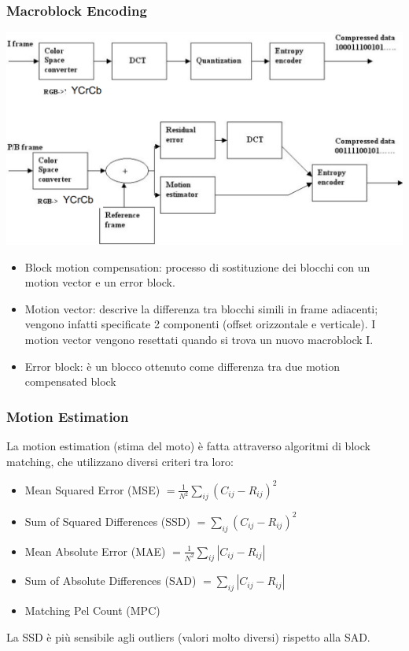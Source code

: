 \documentclass[a4paper,11pt]{article} %
\begin{document}
\subsubsection{Macroblock Encoding}
\begin{center}
    \includegraphics[width=0.64\linewidth]{Macroblock encoding.png}
\end{center}
\begin{itemize}
\item Block motion compensation: processo di sostituzione dei blocchi con un motion vector e un error block.
\item Motion vector: descrive la differenza tra blocchi simili in frame adiacenti; vengono infatti specificate 2 componenti (offset orizzontale e verticale). I motion vector vengono resettati quando si trova un nuovo macroblock I.
\item Error block: è un blocco ottenuto come differenza tra due motion compensated block
\end{itemize}

\subsubsection{Motion Estimation}
La motion estimation (stima del moto) è fatta attraverso algoritmi di block matching, che utilizzano diversi criteri tra loro:
\begin{itemize}
\item Mean Squared Error (MSE) $= \frac{1}{N^2} \sum_{ij} (C_{ij} - R_{ij})^2$
\item Sum of Squared Differences (SSD) $= \sum_{ij} (C_{ij} - R_{ij})^2$
\item Mean Absolute Error (MAE) $= \frac{1}{N^2} \sum_{ij} |C_{ij} - R_{ij}|$
\item Sum of Absolute Differences (SAD) $= \sum_{ij} |C_{ij} - R_{ij}|$
\item Matching Pel Count (MPC)
\end{itemize}
La SSD è più sensibile agli outliers (valori molto diversi) rispetto alla SAD.
\end{document}

